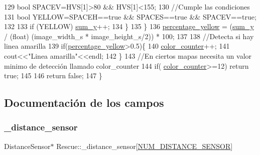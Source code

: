 \begin{DoxyCode}
129             \textcolor{keywordtype}{bool} SPACEV=HVS[1]>80 && HVS[1]<155;
130             \textcolor{comment}{//Cumple las condiciones    }
131             \textcolor{keywordtype}{bool} YELLOW=SPACEH==\textcolor{keyword}{true} && SPACES==\textcolor{keyword}{true} && SPACEV==\textcolor{keyword}{true};
132                 
133             \textcolor{keywordflow}{if} (YELLOW) \hyperlink{classRescue_a9a95f0cd95b72a89f87c6e9b19d71f73_a9a95f0cd95b72a89f87c6e9b19d71f73}{sum\_y}++;
134          \}
135      \}
136      \hyperlink{classRescue_ad0101336342f1b5e9753b692d0d8b484_ad0101336342f1b5e9753b692d0d8b484}{percentage\_yellow} = (\hyperlink{classRescue_a9a95f0cd95b72a89f87c6e9b19d71f73_a9a95f0cd95b72a89f87c6e9b19d71f73}{sum\_y} / (float) (image\_width\_s * image\_height\_s/2)) * 100;
137      
138      \textcolor{comment}{//Detecta si hay linea amarilla   }
139      \textcolor{keywordflow}{if}(\hyperlink{classRescue_ad0101336342f1b5e9753b692d0d8b484_ad0101336342f1b5e9753b692d0d8b484}{percentage\_yellow}>0.5)\{
140        \hyperlink{classRescue_a180e2955648c5bae24069da9db0c1a5f_a180e2955648c5bae24069da9db0c1a5f}{color\_counter}++;
141        cout<<\textcolor{stringliteral}{"Linea amarilla"}<<endl;
142      \}
143      \textcolor{comment}{//En ciertos mapas necesita un valor minimo de detección llamado color\_counter   }
144      \textcolor{keywordflow}{if}( \hyperlink{classRescue_a180e2955648c5bae24069da9db0c1a5f_a180e2955648c5bae24069da9db0c1a5f}{color\_counter}>=12) \textcolor{keywordflow}{return} \textcolor{keyword}{true};
145         
146      \textcolor{keywordflow}{return} \textcolor{keyword}{false};
147 \}
\end{DoxyCode}


\subsection{Documentación de los campos}
\mbox{\label{classRescue_a1e1f6c1dc43593a25989127b6ca89ae9_a1e1f6c1dc43593a25989127b6ca89ae9}} 
\subsubsection{\texorpdfstring{\+\_\+distance\+\_\+sensor}{\_distance\_sensor}}
{\footnotesize\ttfamily Distance\+Sensor$\ast$ Rescue\+::\+\_\+distance\+\_\+sensor\mbox{[}\hyperlink{Rescue_8h_a3bfa6c68d124846bd629eef1504b2556_a3bfa6c68d124846bd629eef1504b2556}{N\+U\+M\+\_\+\+D\+I\+S\+T\+A\+N\+C\+E\+\_\+\+S\+E\+N\+S\+OR}\mbox{]}\hspace{0.3cm}{\ttfamily [private]}}



